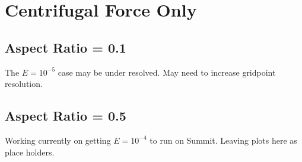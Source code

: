 \section{Centrifugal Force Only}

\subsection{Aspect Ratio = 0.1}

The $E=10^{-5}$ case may be under resolved. May need to increase gridpoint resolution. 

\keradius

\azavgtemperature

\azavgomega
 
\azavgmassflux

\fluxpol

\fluxeq

\condfluxrin

\condfluxrout

\ekfixtable

\clearpage

\subsection{Aspect Ratio = 0.5}

Working currently on getting $E = 10^{-4}$ to run on Summit. Leaving plots here as place holders.

\keradiusarfive

\azavgtemperaturearfive

\azavgomegaarfive

\azavgmassfluxarfive

\centrifugaltablearfive

\clearpage
